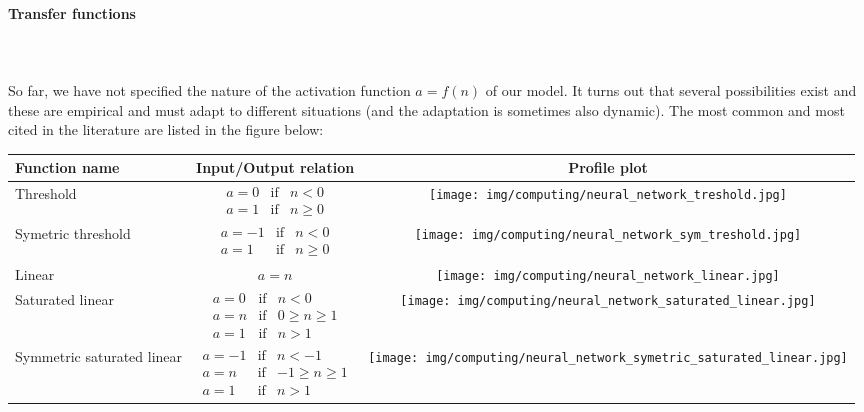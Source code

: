 	\pagebreak
	\paragraph{Transfer functions}\mbox{}\\\\
	So far, we have not specified the nature of the activation function $a=f(n)$ of our model. It turns out that several possibilities exist and these are empirical and must adapt to different situations (and the adaptation is sometimes also dynamic). The most common and most cited in the literature are listed in the figure below:
	\begin{table}[H]
		\begin{center}
				\begin{tabular}{|l||c|c|}
					\hline
					{\cellcolor{black!30}Function name} & {\cellcolor{black!30}Input/Output relation} & {\cellcolor{black!30}Profile plot}  \\ \hline
					Threshold & $\begin{matrix}a=0 & \text{if} & n<0\\a=1 & \text{if} & n\geq 0 \end{matrix}$ & \parbox{1.5cm}{\texttt{[image: img/computing/neural\_network\_treshold.jpg]}}\\ \hline
					Symetric threshold & $\begin{matrix}a=-1 & \text{if} & n<0\\a=1 & \text{if} & n\geq 0 \end{matrix}$ & \parbox{1.5cm}{\texttt{[image: img/computing/neural\_network\_sym\_treshold.jpg]}}\\ \hline
					Linear & $a=n$ & \parbox{1.5cm}{\texttt{[image: img/computing/neural\_network\_linear.jpg]}}\\ \hline
					Saturated linear & $\begin{matrix}a=0 & \text{if} & n<0\\a=n & \text{if} & 0\geq n \geq 1\\ a=1 & \text{if} & n>1 \end{matrix}$ & \parbox{1.5cm}{\texttt{[image: img/computing/neural\_network\_saturated\_linear.jpg]}}\\  \hline
					Symmetric saturated linear & $\begin{matrix}a=-1 & \text{if} & n<-1\\a=n & \text{if} & -1\geq n \geq 1\\ a=1 & \text{if} & n>1 \end{matrix}$ & \parbox{1.5cm}{\texttt{[image: img/computing/neural\_network\_symetric\_saturated\_linear.jpg]}}\\ \hline

\end{tabular}
\end{center}
\end{table}

